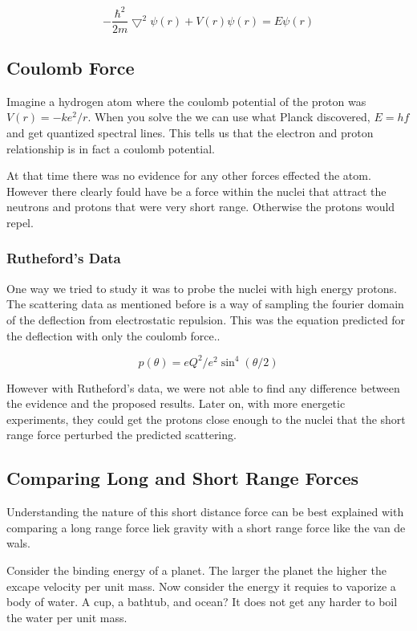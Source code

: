 \documentclass[english, 11pt]{article}
\begin{document}
      \begin{defn}\label{swe}
        \[ -\frac{\hbar^2}{2m}\bigtriangledown^2\psi(r) + V(r)\psi(r) = E\psi(r) \]
      \end{defn}

      \subsection{Coulomb Force}
        Imagine a hydrogen atom where the coulomb potential of the proton was $V(r) = -ke^2/r$. When you solve the  we can use what Planck discovered, $E=hf$ and get quantized spectral lines. This tells us that the electron and proton relationship is in fact a coulomb potential.

        At that time there was no evidence for any other forces effected the atom. However there clearly fould have be a force within the nuclei that attract the neutrons and protons that were very short range. Otherwise the protons would repel. 

      \subsubsection{Rutheford's Data}
        One way we tried to study it was to probe the nuclei with high energy protons. The scattering data as mentioned before is a way of sampling the fourier domain of the deflection from electrostatic repulsion. This was the equation predicted for the deflection with only the coulomb force..

          \[ p(\theta) = eQ^2 / e^2\sin^4(\theta/2) \]

        However with Rutheford's data, we were not able to find any difference between the evidence and the proposed results. Later on, with more energetic experiments, they could get the protons close enough to the nuclei that the short range force perturbed the predicted scattering.

      \subsection{Comparing Long and Short Range Forces}
        Understanding the nature of this short distance force can be best explained with comparing a long range force liek gravity with a short range force like the van de wals. 

        Consider the binding energy of a planet. The larger the planet the higher the excape velocity per unit mass. Now consider the energy it requies to vaporize a body of water. A cup, a bathtub, and ocean? It does not get any harder to boil the water per unit mass. 
\end{document}
